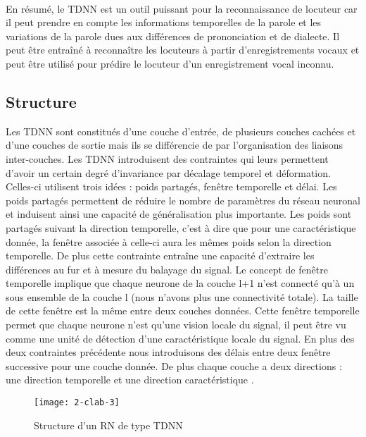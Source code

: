 \paragraph{}En résumé, le TDNN est un outil puissant pour la reconnaissance de locuteur car il peut prendre en compte les informations temporelles de la parole et les variations de la parole dues aux différences de prononciation et de dialecte. Il peut être entraîné à reconnaître les locuteurs à partir d'enregistrements vocaux et peut être utilisé pour prédire le locuteur d'un enregistrement vocal inconnu.

\subsection{Structure }
Les TDNN sont constitués  d'une couche d'entrée, de plusieurs couches cachées et d'une couches de sortie mais ils se différencie de par l'organisation des liaisons inter-couches. Les TDNN introduisent des contraintes qui leurs permettent d'avoir un certain degré d'invariance par décalage temporel et déformation. Celles-ci utilisent trois idées : poids partagés, fenêtre temporelle et délai.
Les poids partagés permettent de réduire le nombre de paramètres du réseau neuronal et induisent ainsi une capacité de généralisation plus importante. Les poids sont partagés suivant la direction temporelle, c'est à dire que pour une caractéristique donnée, la fenêtre associée à celle-ci aura les mêmes poids selon la direction temporelle. De plus cette contrainte entraîne une capacité d'extraire les différences au fur et à mesure du balayage du signal. 
Le concept de fenêtre temporelle implique que chaque neurone de la couche l+1 n'est connecté qu'à un sous ensemble de la couche l (nous n'avons plus une connectivité totale). La taille de cette fenêtre est la même entre deux couches données. Cette fenêtre temporelle permet que chaque neurone n'est qu'une vision locale du signal, il peut être vu comme une unité de détection d'une caractéristique locale du signal.
En plus des deux contraintes précédente nous introduisons des délais entre deux fenêtre successive pour une couche donnée.
De plus chaque couche a deux directions : une direction temporelle et une direction caractéristique \cite{frontiers}.

\begin{figure}[ht]
    \centering
    \texttt{[image: 2-clab-3]}
    \caption{Structure d'un RN de type TDNN}
    \label{fig:2-clab-3}
\end{figure}

